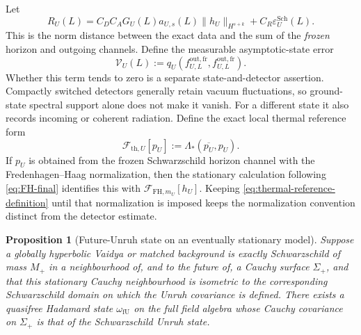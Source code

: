 \documentclass[11pt,a4paper]{article}
\newtheorem{proposition}[theorem]{Proposition}
\theoremstyle{definition}
\theoremstyle{remark}
\begin{document}
	Let
	\begin{equation}
		R_U(L)=
		C_D C_A G_U(L)a_{U,s}(L)\|h_U\|_{H^{s+k}}
		+C_R\varepsilon^{\mathrm{Sch}}_U(L).
		\label{eq:response-propagation-error}
	\end{equation}
	This is the norm distance between the exact data and the sum of the
	\emph{frozen} horizon and outgoing channels.  Define the measurable
	asymptotic-state error
	\begin{equation}
		\mathcal V_U(L):=
		q_U(f^{\mathrm{out,fr}}_{U,L},f^{\mathrm{out,fr}}_{U,L}).
		\label{eq:outgoing-state-error}
	\end{equation}
	Whether this term tends to zero is a separate state-and-detector assertion.
	Compactly switched detectors generally retain vacuum fluctuations, so
	ground-state spectral support alone does not make it vanish.  For a different
	state it also records incoming or coherent radiation.
	Define the exact local thermal reference form
	\begin{equation}
		\mathcal F_{\mathrm{th},U}[p_U]
		:=\Lambda_*(\overline{p_U},p_U).
		\label{eq:thermal-reference-definition}
	\end{equation}
	If $p_U$ is obtained from the frozen Schwarzschild horizon channel with the
	Fredenhagen--Haag normalization, then the stationary calculation following
	\eqref{eq:FH-final} identifies this with
	$\mathcal F_{\mathrm{FH},m_U}[h_U]$.  Keeping
	\eqref{eq:thermal-reference-definition} until that normalization is imposed
	keeps the normalization convention distinct from the detector estimate.
	
	\begin{proposition}[Future-Unruh state on an eventually stationary model]
		\label{prop:future-Unruh}
		Suppose a globally hyperbolic Vaidya or matched background is exactly
		Schwarzschild of mass $M_+$ in a neighbourhood of, and to the future of, a
		Cauchy surface $\Sigma_+$, and that this stationary Cauchy neighbourhood is
		isometric to the corresponding Schwarzschild domain on which the Unruh
		covariance is defined.
		There exists a quasifree Hadamard state $\omega_{\mathrm{fU}}$ on the full
		field algebra whose Cauchy covariance on $\Sigma_+$ is that of the
		Schwarzschild Unruh state.
	\end{proposition}
	
\end{document}
